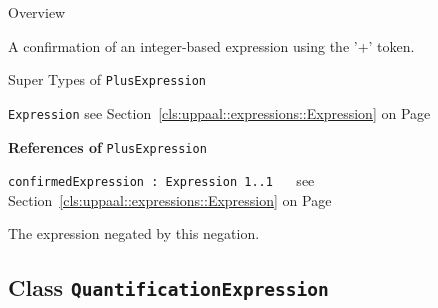 	\begin{longdescription}
		\item[Overview] 		
				

	

		A confirmation of an integer-based expression using the '+' token.		
		\item[Super Types of \texttt{PlusExpression}] ~
			\begin{longdescription}
				\item[\texttt{Expression}] see Section~\ref{cls:uppaal::expressions::Expression} on Page~\pageref{cls:uppaal::expressions::Expression}						\end{longdescription}
		
	
			\item[\textbf{References of} \texttt{PlusExpression}] ~
			\begin{longdescription}
	\item[\texttt{confirmedExpression : Expression 	\symbol{"5B}1..1\symbol{"5D}
}] ~
	see Section~\ref{cls:uppaal::expressions::Expression} on Page~\pageref{cls:uppaal::expressions::Expression}
	
	\nopagebreak
		
				

	

		The expression negated by this negation.		
			\end{longdescription}
	
	\end{longdescription}
	

\subsection{Class \bfseries \texttt{QuantificationExpression}\normalfont}
\label{cls:uppaal::expressions::QuantificationExpression} 
	

